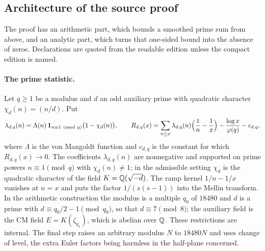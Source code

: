 \subsection{Architecture of the source proof}\label{src:sec:mechanism}
\begingroup\raggedright
{}
\endgroup

The proof has an arithmetic part, which bounds a smoothed prime sum from above, and an
analytic part, which turns that one-sided bound into the absence of zeros. Declarations are
quoted from the readable edition unless the compact edition is named.

\paragraph{The prime statistic.}
Let $q\ge1$ be a modulus and $d$ an odd auxiliary prime with quadratic character
$\chi_d(n)=(n/d)$. Put
\begin{equation}\label{src:eq:R}
\lambda_{d,q}(n)=\Lambda(n)\,\mathbf 1_{n\equiv1\ (\mathrm{mod}\ q)}\bigl(1-\chi_d(n)\bigr),\qquad
R_{d,q}(x)=\sum_{n\le x}\lambda_{d,q}(n)\Bigl(\frac1n-\frac1x\Bigr)-\frac{\log x}{\varphi(q)}-c_{d,q},
\end{equation}
where $\Lambda$ is the von Mangoldt function and $c_{d,q}$ is the constant for which
$R_{d,q}(x)\to0$. The coefficients $\lambda_{d,q}(n)$ are nonnegative and supported on prime
powers $n\equiv1\pmod q$ with $\chi_d(n)\ne1$; in the admissible setting $\chi_d$ is the
quadratic character of the field $K=\mathbb{Q}(\sqrt{-d})$. The ramp kernel
$1/n-1/x$ vanishes at $n=x$ and puts the factor $1/(s(s-1))$ into the Mellin transform. In
the arithmetic construction the modulus is a multiple $q_0$ of $18480$ and $d$ is a prime
with $d\equiv q_0/2-1\pmod{q_0}$, so that $d\equiv7\pmod 8$; the auxiliary field is the CM
field $E=K(\zeta_{q_1})$, which is abelian over $\mathbb{Q}$. These restrictions are internal. The
final step raises an arbitrary modulus $N$ to $18480N$ and uses change of level, the extra
Euler factors being harmless in the half-plane concerned.


